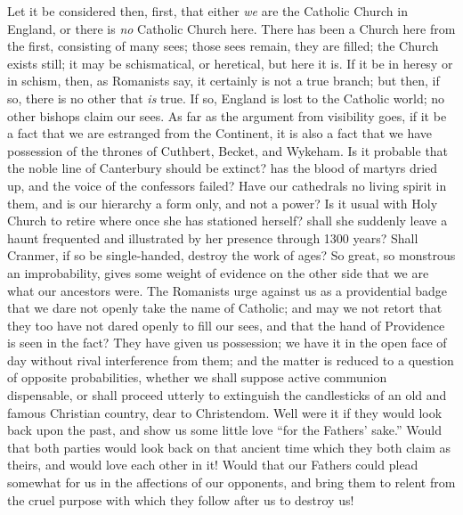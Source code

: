Let it be considered then, first, that either \emph{we}
are the Catholic Church in England, or there is \emph{no} Catholic
Church here. There has been a Church here from the first, consisting
of many sees; those sees remain, they are filled; the Church exists
still; it may be schismatical, or heretical, but here it is. If it be
in heresy or in schism, then, as Romanists say, it certainly is not a
true branch; but then, if so, there is no other that \emph{is} true.
If so, England is lost to the Catholic world; no other bishops claim
our sees. As far as the argument from visibility goes, if it be a
fact that we are estranged from the Continent, it is also a fact that
we have possession of the thrones of Cuthbert, Becket, and Wykeham. Is
it probable that the noble line of Canterbury should be extinct? has
the blood of martyrs dried up, and the voice of the confessors failed?
Have our cathedrals no living spirit in them, and is our hierarchy a
form only, and not a power? Is it usual with Holy Church to retire
where once she has stationed herself? shall she suddenly leave a haunt
frequented and illustrated by her presence through 1300 years? Shall
Cranmer, if so be single-handed, destroy the work of ages? So great,
so monstrous an improbability, gives some weight of evidence on the
other side that we are what our ancestors were. The Romanists urge
against us as a providential badge that we dare not openly take the
name of Catholic; and may we not retort that they too have not dared
openly to fill our sees, and that the hand of Providence is seen in
the fact? They have given us possession; we have it in the open face
of day without rival interference from them; and the matter is reduced
to a question of opposite probabilities, whether we shall suppose
active communion dispensable, or shall proceed utterly to extinguish
the candlesticks of an old and famous Christian country, dear to
Christendom. Well were it if they would look back upon the past, and
show us some little love ``for the Fathers' sake.'' Would that
both parties would look back on that ancient time which they both
claim as theirs, and would love each other in it! Would that our
Fathers could plead somewhat for us in the affections of our
opponents, and bring them to relent from the cruel purpose with which
they follow after us to destroy us!

